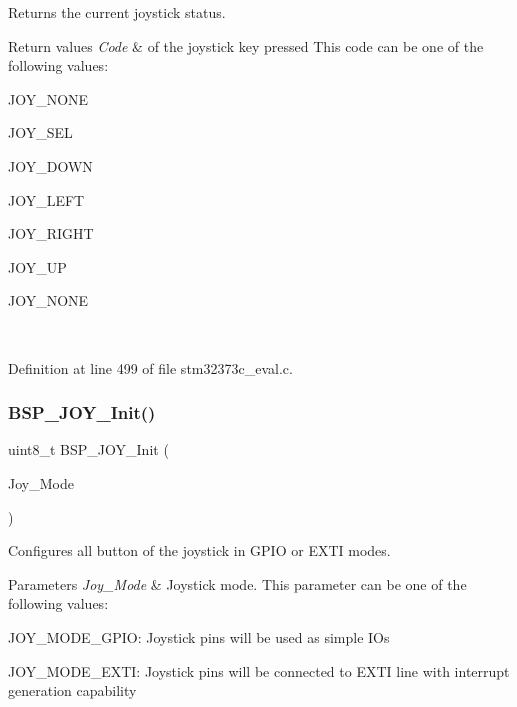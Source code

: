 Returns the current joystick status. 


\begin{DoxyRetVals}{Return values}
{\em Code} & of the joystick key pressed This code can be one of the following values\+: \begin{DoxyItemize}
\item J\+O\+Y\+\_\+\+N\+O\+NE \item J\+O\+Y\+\_\+\+S\+EL \item J\+O\+Y\+\_\+\+D\+O\+WN \item J\+O\+Y\+\_\+\+L\+E\+FT \item J\+O\+Y\+\_\+\+R\+I\+G\+HT \item J\+O\+Y\+\_\+\+UP \item J\+O\+Y\+\_\+\+N\+O\+NE \end{DoxyItemize}
\\
\hline
\end{DoxyRetVals}


Definition at line 499 of file stm32373c\+\_\+eval.\+c.

\mbox{\label{group___private___functions_ga1a5bc41baa164f7941e51ec747589c55}} 
\subsubsection{B\+S\+P\+\_\+\+J\+O\+Y\+\_\+\+Init()}
{\footnotesize\ttfamily uint8\+\_\+t B\+S\+P\+\_\+\+J\+O\+Y\+\_\+\+Init (\begin{DoxyParamCaption}\item[{\textbf{ J\+O\+Y\+Mode\+\_\+\+Type\+Def}}]{Joy\+\_\+\+Mode }\end{DoxyParamCaption})}



Configures all button of the joystick in G\+P\+IO or E\+X\+TI modes. 


\begin{DoxyParams}{Parameters}
{\em Joy\+\_\+\+Mode} & Joystick mode. This parameter can be one of the following values\+: \begin{DoxyItemize}
\item J\+O\+Y\+\_\+\+M\+O\+D\+E\+\_\+\+G\+P\+IO\+: Joystick pins will be used as simple I\+Os \item J\+O\+Y\+\_\+\+M\+O\+D\+E\+\_\+\+E\+X\+TI\+: Joystick pins will be connected to E\+X\+TI line with interrupt generation capability ~\newline
\end{DoxyItemize}
\\
\hline
\end{DoxyParams}

